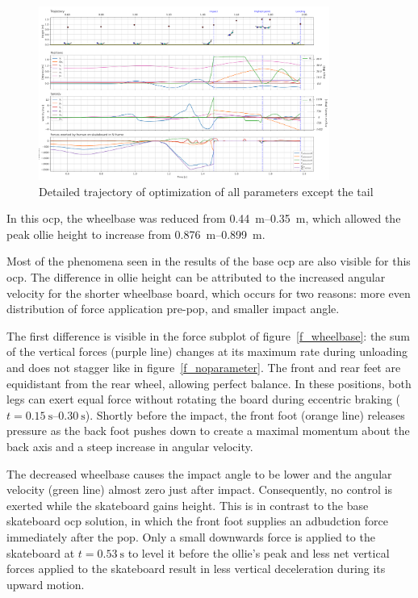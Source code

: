 \documentclass[default,iicol]{sn-jnl}
\begin{document}
\begin{figure}
    \includegraphics[trim={0cm 0cm 0cm 0cm},clip,width=0.85\textwidth]{paper/figure/Results/data_no_taildpi600 (1).png}
    \caption[Trajectory, positions, speeds, and forces for `all except tail length' optimization]{Detailed trajectory of optimization of all parameters except the tail}\label{f_notail}
\end{figure}

In this \gls{ocp}, the wheelbase was reduced from \SIrange{0.44}{0.35}{\meter}, which allowed the peak ollie height to increase from \SIrange{0.876}{0.899}{\meter}.

Most of the phenomena seen in the results of the base \gls{ocp} are also visible for this \gls{ocp}.
The difference in ollie height can be attributed to the increased angular velocity for the shorter wheelbase board, which occurs for two reasons: more even distribution of force application pre-pop, and smaller impact angle.

The first difference is visible in the force subplot of figure~\ref{f_wheelbase}: the sum of the vertical forces (purple line) changes at its maximum rate during unloading and does not stagger like in figure~\ref{f_noparameter}.
The front and rear feet are equidistant from the rear wheel, allowing perfect balance.
In these positions, both legs can exert equal force without rotating the board during eccentric braking ($t=\SIrange{0.15}{0.30}{\second}$). 
Shortly before the impact, the front foot (orange line) releases pressure as the back foot pushes down to create a maximal momentum about the back axis and a steep increase in angular velocity. 

The decreased wheelbase causes the impact angle to be lower and the angular velocity (green line) almost zero just after impact.
Consequently, no control is exerted while the skateboard gains height.
This is in contrast to the base skateboard \gls{ocp} solution, in which the front foot supplies an adbudction force immediately after the pop.
Only a small downwards force is applied to the skateboard at $t=\SI{0.53}{\second}$ to level it before the ollie's peak and less net vertical forces applied to the skateboard result in less vertical deceleration during its upward motion.
\end{document}
